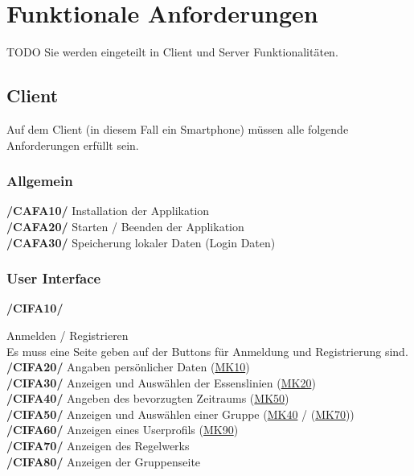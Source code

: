 \documentclass[a4paper]{scrreprt}
\begin{document}
\chapter{Funktionale Anforderungen}
TODO Sie werden eingeteilt in Client und Server Funktionalitäten.

\section{Client}
Auf dem Client (in diesem Fall ein Smartphone) müssen alle folgende Anforderungen erfüllt sein. 

\subsection{Allgemein}

\begin{addmargin}[25pt]{0pt} 
\textbf{/CAFA10/} Installation der Applikation \\
\textbf{/CAFA20/} Starten / Beenden der Applikation\\
\textbf{/CAFA30/} Speicherung lokaler Daten (Login Daten)\\
\end{addmargin}

\subsection{User Interface}

\begin{addmargin}[25pt]{0pt} 
\hypertarget{cifa10}{\textbf{/CIFA10/}} Anmelden / Registrieren \\
Es muss eine Seite geben auf der Buttons für Anmeldung und Registrierung sind.
\hypertarget{cifa20}{\textbf{/CIFA20/}} Angaben persönlicher Daten (\hyperlink{mk10}{MK10})\\
\hypertarget{cifa30}{\textbf{/CIFA30/}} Anzeigen und Auswählen der Essenslinien (\hyperlink{mk20}{MK20})\\
\hypertarget{cifa40}{\textbf{/CIFA40/}} Angeben des bevorzugten Zeitraums (\hyperlink{mk50}{MK50})\\
\hypertarget{cifa50}{\textbf{/CIFA50/}} Anzeigen und Auswählen einer Gruppe (\hyperlink{m40}{MK40} / (\hyperlink{mk70}{MK70}))\\
\hypertarget{cifa60}{\textbf{/CIFA60/}} Anzeigen eines Userprofils (\hyperlink{mk90}{MK90})\\
\hypertarget{cifa70}{\textbf{/CIFA70/}} Anzeigen des Regelwerks\\
\hypertarget{cifa80}{\textbf{/CIFA80/}} Anzeigen der Gruppenseite\\
\end{addmargin}
\end{document}
